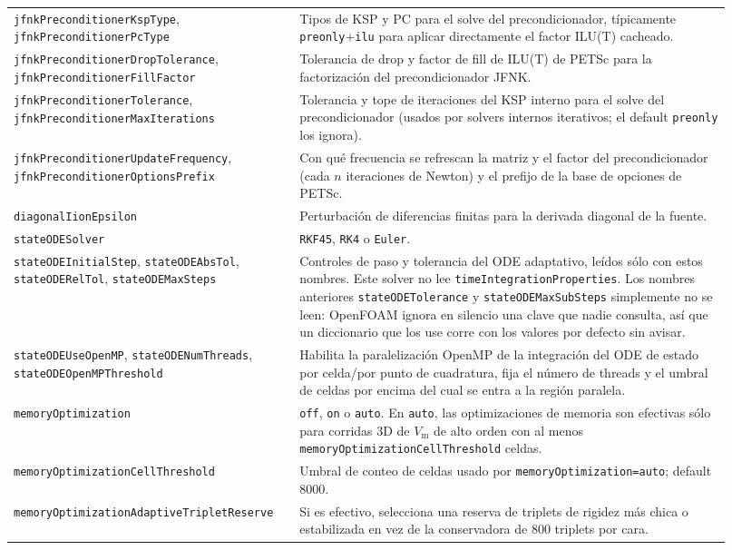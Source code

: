 \documentclass[11pt,a4paper]{article}
\newcommand{\code}[1]{\texttt{\small #1}}
\newcommand{\Vm}{V_{\text{m}}}
\begin{document}
\begin{longtable}{@{}p{0.34\linewidth}p{0.58\linewidth}@{}}
\code{jfnkPreconditionerKspType}, \code{jfnkPreconditionerPcType} & Tipos de KSP y PC para el solve del precondicionador, típicamente \code{preonly}+\code{ilu} para aplicar directamente el factor ILU(T) cacheado. \\
\code{jfnkPreconditionerDropTolerance}, \code{jfnkPreconditionerFillFactor} & Tolerancia de drop y factor de fill de ILU(T) de PETSc para la factorización del precondicionador JFNK. \\
\code{jfnkPreconditionerTolerance}, \code{jfnkPreconditionerMaxIterations} & Tolerancia y tope de iteraciones del KSP interno para el solve del precondicionador (usados por solvers internos iterativos; el default \code{preonly} los ignora). \\
\code{jfnkPreconditionerUpdateFrequency}, \code{jfnkPreconditionerOptionsPrefix} & Con qué frecuencia se refrescan la matriz y el factor del precondicionador (cada $n$ iteraciones de Newton) y el prefijo de la base de opciones de PETSc. \\
\code{diagonalIionEpsilon} & Perturbación de diferencias finitas para la derivada diagonal de la fuente. \\
\code{stateODESolver} & \code{RKF45}, \code{RK4} o \code{Euler}. \\
\code{stateODEInitialStep}, \code{stateODEAbsTol}, \code{stateODERelTol}, \code{stateODEMaxSteps} & Controles de paso y tolerancia del ODE adaptativo, leídos sólo con estos nombres. Este solver no lee \code{timeIntegrationProperties}. Los nombres anteriores \code{stateODETolerance} y \code{stateODEMaxSubSteps} simplemente no se leen: OpenFOAM ignora en silencio una clave que nadie consulta, así que un diccionario que los use corre con los valores por defecto sin avisar. \\
\code{stateODEUseOpenMP}, \code{stateODENumThreads}, \code{stateODEOpenMPThreshold} & Habilita la paralelización OpenMP de la integración del ODE de estado por celda/por punto de cuadratura, fija el número de threads y el umbral de celdas por encima del cual se entra a la región paralela. \\
\code{memoryOptimization} & \code{off}, \code{on} o \code{auto}. En \code{auto}, las optimizaciones de memoria son efectivas sólo para corridas 3D de $\Vm$ de alto orden con al menos \code{memoryOptimizationCellThreshold} celdas. \\
\code{memoryOptimizationCellThreshold} & Umbral de conteo de celdas usado por \code{memoryOptimization=auto}; default 8000. \\
\code{memoryOptimizationAdaptiveTripletReserve} & Si es efectivo, selecciona una reserva de triplets de rigidez más chica o estabilizada en vez de la conservadora de 800 triplets por cara. \\

\end{longtable}
\end{document}
